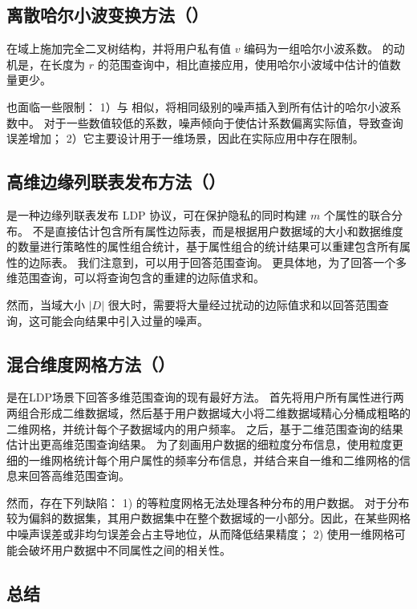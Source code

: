 \subsection{离散哈尔小波变换方法（\mydht）}
\label{exsitingDHT}
\mydht \cite{cormode2019answering} 在域上施加完全二叉树结构，并将用户私有值 $v$ 编码为一组哈尔小波系数。 
\mydht 的动机是，在长度为 $r$ 的范围查询中，相比直接应用\fo ，使用哈尔小波域中估计的值数量更少。

\mydht 也面临一些限制：
1）与 \myhio 相似，\mydht 将相同级别的噪声插入到所有估计的哈尔小波系数中。
对于一些数值较低的系数，噪声倾向于使估计系数偏离实际值，导致查询误差增加；
2）它主要设计用于一维场景，因此在实际应用中存在限制。


\subsection{高维边缘列联表发布方法（\mycalm）}
\label{Consistent Adaptive Local Marginal}
\mycalm \cite{zhang2018calm} 是一种边缘列联表发布 LDP 协议，可在保护隐私的同时构建 $m$ 个属性的联合分布。
\mycalm 不是直接估计包含所有属性边际表，而是根据用户数据域的大小和数据维度的数量进行策略性的属性组合统计，基于属性组合的统计结果可以重建包含所有属性的边际表。
我们注意到，\mycalm 可以用于回答范围查询。
更具体地，为了回答一个多维范围查询，\mycalm 可以将查询包含的重建的边际值求和。

然而，当域大小 $|D|$ 很大时，\mycalm 需要将大量经过扰动的边际值求和以回答范围查询，这可能会向结果中引入过量的噪声。

\subsection{混合维度网格方法（\myHDG）}
\myHDG \cite{yang2020answering}是在LDP场景下回答多维范围查询的现有最好方法。
\myHDG 首先将用户所有属性进行两两组合形成二维数据域，然后基于用户数据域大小将二维数据域精心分桶成粗略的二维网格，并统计每个子数据域内的用户频率。
之后，\myHDG 基于二维范围查询的结果估计出更高维范围查询结果。
为了刻画用户数据的细粒度分布信息，\myHDG 使用粒度更细的一维网格统计每个用户属性的频率分布信息，并结合来自一维和二维网格的信息来回答高维范围查询。

然而，\myHDG 存在下列缺陷：
1) \myHDG 的等粒度网格无法处理各种分布的用户数据。
对于分布较为偏斜的数据集，其用户数据集中在整个数据域的一小部分。因此，在某些网格中噪声误差或非均匀误差会占主导地位，从而降低结果精度；
2) 使用一维网格可能会破坏用户数据中不同属性之间的相关性。

\subsection{总结}
\label{Remarks}

